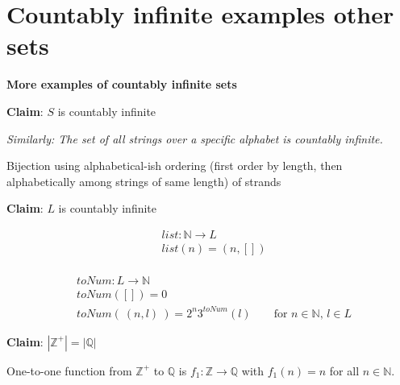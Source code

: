 \documentclass[12pt, oneside]{article}
\begin{document}
 \vfill
\section*{Countably infinite examples other sets}


{\bf More examples of countably infinite sets}

{\bf Claim}: $S$ is countably infinite

{\it Similarly: The set of all strings over a specific alphabet is countably infinite.}
\begin{center}
Bijection using alphabetical-ish ordering
(first order by length, then alphabetically among strings of same length) 
of strands
\end{center}

\vspace{50pt}


{\bf Claim}: $L$ is countably infinite

\begin{multicols}{2}
\begin{align*}
    &list: \mathbb{N} \to L \\
    &list(n) = (n, []) \\
    &
\end{align*}

\begin{align*}
    &toNum: L \to \mathbb{N} \\
    &toNum([]) = 0 \\
    &toNum( ~(n,l)~) = 2^n 3^{toNum}(l) \qquad \text{for $n \in \mathbb{N}$, $l \in L$}
\end{align*}
\end{multicols}
\vspace{30pt}

{\bf Claim}: $|\mathbb{Z}^+| = |\mathbb{Q}|$ 

One-to-one function from $\mathbb{Z}^+$ to $\mathbb{Q}$
is $f_1: \mathbb{Z} \to \mathbb{Q}$ with $f_1(n) = n$ for all 
$n \in \mathbb{N}$.

\vspace{30pt}
\end{document}
